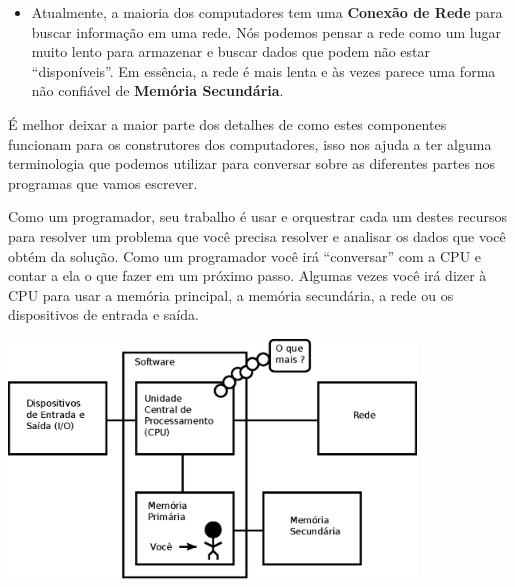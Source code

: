 \begin{itemize}
\item Atualmente, a maioria dos computadores tem uma
{\bf Conexão de Rede} para buscar informação em uma rede.
Nós podemos pensar a rede como um lugar muito lento para armazenar
e buscar dados que podem não estar ``disponíveis''. Em essência,
a rede é mais lenta e às vezes parece uma forma não confiável de
{\bf Memória Secundária}.
%

\end{itemize}
%

É melhor deixar a maior parte dos detalhes de como estes componentes funcionam para
os construtores dos computadores, isso nos ajuda a ter alguma terminologia
que podemos utilizar para conversar sobre as diferentes partes nos programas
que vamos escrever.
%

Como um programador, seu trabalho é usar e orquestrar
cada um destes recursos para resolver um problema que você precisa resolver
e analisar os dados que você obtém da solução. Como um programador você irá
``conversar'' com a CPU e contar a ela o que fazer em um próximo passo.
Algumas vezes você irá dizer à CPU para usar a memória principal, a memória
secundária, a rede ou os dispositivos de entrada e saída.
%

\beforefig
\centerline{\includegraphics[height=2.50in]{figs2/arch2.eps}}
\afterfig
%

